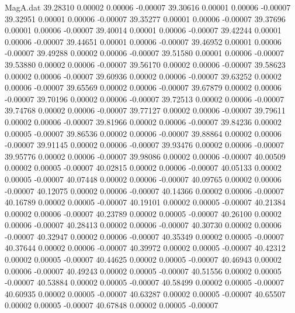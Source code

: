 \begin{filecontents}{MagA.dat}
  39.28310    0.00002    0.00006   -0.00007
  39.30616    0.00001    0.00006   -0.00007
  39.32951    0.00001    0.00006   -0.00007
  39.35277    0.00001    0.00006   -0.00007
  39.37696    0.00001    0.00006   -0.00007
  39.40014    0.00001    0.00006   -0.00007
  39.42244    0.00001    0.00006   -0.00007
  39.44651    0.00001    0.00006   -0.00007
  39.46952    0.00001    0.00006   -0.00007
  39.49288    0.00002    0.00006   -0.00007
  39.51580    0.00001    0.00006   -0.00007
  39.53880    0.00002    0.00006   -0.00007
  39.56170    0.00002    0.00006   -0.00007
  39.58623    0.00002    0.00006   -0.00007
  39.60936    0.00002    0.00006   -0.00007
  39.63252    0.00002    0.00006   -0.00007
  39.65569    0.00002    0.00006   -0.00007
  39.67879    0.00002    0.00006   -0.00007
  39.70196    0.00002    0.00006   -0.00007
  39.72513    0.00002    0.00006   -0.00007
  39.74768    0.00002    0.00006   -0.00007
  39.77127    0.00002    0.00006   -0.00007
  39.79611    0.00002    0.00006   -0.00007
  39.81966    0.00002    0.00006   -0.00007
  39.84236    0.00002    0.00005   -0.00007
  39.86536    0.00002    0.00006   -0.00007
  39.88864    0.00002    0.00006   -0.00007
  39.91145    0.00002    0.00006   -0.00007
  39.93476    0.00002    0.00006   -0.00007
  39.95776    0.00002    0.00006   -0.00007
  39.98086    0.00002    0.00006   -0.00007
  40.00509    0.00002    0.00005   -0.00007
  40.02815    0.00002    0.00006   -0.00007
  40.05133    0.00002    0.00005   -0.00007
  40.07448    0.00002    0.00006   -0.00007
  40.09765    0.00002    0.00006   -0.00007
  40.12075    0.00002    0.00006   -0.00007
  40.14366    0.00002    0.00006   -0.00007
  40.16789    0.00002    0.00005   -0.00007
  40.19101    0.00002    0.00005   -0.00007
  40.21384    0.00002    0.00006   -0.00007
  40.23789    0.00002    0.00005   -0.00007
  40.26100    0.00002    0.00006   -0.00007
  40.28413    0.00002    0.00006   -0.00007
  40.30730    0.00002    0.00006   -0.00007
  40.32947    0.00002    0.00006   -0.00007
  40.35349    0.00002    0.00005   -0.00007
  40.37644    0.00002    0.00006   -0.00007
  40.39972    0.00002    0.00005   -0.00007
  40.42312    0.00002    0.00005   -0.00007
  40.44625    0.00002    0.00005   -0.00007
  40.46943    0.00002    0.00006   -0.00007
  40.49243    0.00002    0.00005   -0.00007
  40.51556    0.00002    0.00005   -0.00007
  40.53884    0.00002    0.00005   -0.00007
  40.58499    0.00002    0.00005   -0.00007
  40.60935    0.00002    0.00005   -0.00007
  40.63287    0.00002    0.00005   -0.00007
  40.65507    0.00002    0.00005   -0.00007
  40.67848    0.00002    0.00005   -0.00007

\end{filecontents}
